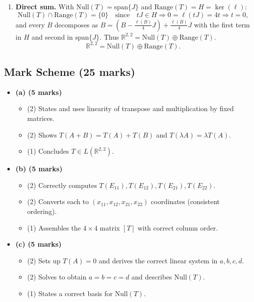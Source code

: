\documentclass[12pt]{article}
\newcommand{\R}{\mathbb{R}}
\begin{document}
\begin{enumerate}[label=(\alph*)]
\item \textbf{Direct sum.}
With $\mathrm{Null}(T)=\mathrm{span}\{J\}$ and $\mathrm{Range}(T)=H=\ker(\ell)$:
\[
\mathrm{Null}(T)\cap \mathrm{Range}(T)=\{0\}
\quad\text{since}\quad
tJ\in H\Rightarrow 0=\ell(tJ)=4t\Rightarrow t=0,
\]
and every $B$ decomposes as $B=(B-\frac{\ell(B)}{4}J)+\frac{\ell(B)}{4}J$ with the first term in $H$ and second in $\mathrm{span}\{J\}$.
Thus $\R^{2,2}=\mathrm{Null}(T)\oplus \mathrm{Range}(T)$.
\[
\boxed{\,\R^{2,2}=\mathrm{Null}(T)\oplus \mathrm{Range}(T).\,}
\]
\end{enumerate}

\newpage
\subsection{Mark Scheme (25 marks)}
\begin{itemize}[leftmargin=1.6em]
  \item \textbf{(a) (5 marks)}
  \begin{itemize}[leftmargin=1.6em]
    \item (2) States and uses linearity of transpose and multiplication by fixed matrices.
    \item (2) Shows $T(A+B)=T(A)+T(B)$ and $T(\lambda A)=\lambda T(A)$.
    \item (1) Concludes $T\in L(\R^{2,2})$.
  \end{itemize}

  \item \textbf{(b) (5 marks)}
  \begin{itemize}[leftmargin=1.6em]
    \item (2) Correctly computes $T(E_{11}),T(E_{12}),T(E_{21}),T(E_{22})$.
    \item (2) Converts each to $(x_{11},x_{12},x_{21},x_{22})$ coordinates (consistent ordering).
    \item (1) Assembles the $4\times 4$ matrix $[T]$ with correct column order.
  \end{itemize}

  \item \textbf{(c) (5 marks)}
  \begin{itemize}[leftmargin=1.6em]
    \item (2) Sets up $T(A)=0$ and derives the correct linear system in $a,b,c,d$.
    \item (2) Solves to obtain $a=b=c=d$ and describes $\mathrm{Null}(T)$.
    \item (1) States a correct basis for $\mathrm{Null}(T)$.
  \end{itemize}


\end{itemize}
\end{document}
